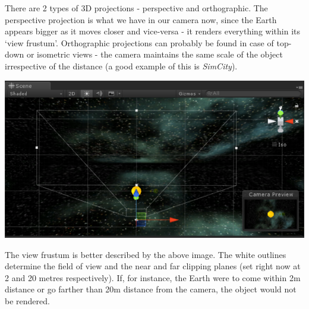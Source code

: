 \documentclass{article}[a4paper,12pt]
\theoremstyle{definition}
\begin{document}
There are 2 types of 3D projections - perspective and orthographic. The perspective projection is what we have in our camera now, since the Earth appears bigger as it moves closer and vice-versa - it renders everything within its `view frustum'. Orthographic projections can probably be found in case of top-down or isometric views - the camera maintains the same scale of the object irrespective of the distance (a good example of this is \textit{SimCity}).
\begin{center}\includegraphics{view_frustum.png}\end{center}
The view frustum is better described by the above image. The white outlines determine the field of view and the near and far clipping planes (set right now at 2 and 20 metres respectively). If, for instance, the Earth were to come within 2m distance or go farther than 20m distance from the camera, the object would not be rendered.
\vspace{6pt}
\end{document}
